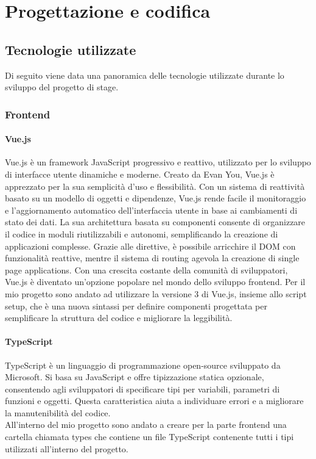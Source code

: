 \chapter{Progettazione e codifica}
\label{cap:progettazione-codifica}


\section{Tecnologie utilizzate}
\label{sec:tecnologie-strumenti}

Di seguito viene data una panoramica delle tecnologie utilizzate durante lo sviluppo del progetto di stage.

\subsection{Frontend}\label{subsec:frontend}
\subsubsection{Vue.js}\label{subsubsec:vue}
Vue.js è un framework JavaScript progressivo e reattivo, utilizzato per lo sviluppo di interfacce utente dinamiche e moderne. 
Creato da Evan You, Vue.js è apprezzato per la sua semplicità d'uso e flessibilità. Con un sistema di reattività basato su un modello di oggetti e dipendenze, 
Vue.js rende facile il monitoraggio e l'aggiornamento automatico dell'interfaccia utente in base ai cambiamenti di stato dei dati. La sua architettura basata 
su componenti consente di organizzare il codice in moduli riutilizzabili e autonomi, semplificando la creazione di applicazioni complesse. 
Grazie alle direttive, è possibile arricchire il DOM con funzionalità reattive, mentre il sistema di routing agevola la creazione di single page applications. 
Con una crescita costante della comunità di sviluppatori, Vue.js è diventato un'opzione popolare nel mondo dello sviluppo frontend.
Per il mio progetto sono andato ad utilizzare la versione 3 di Vue.js, insieme allo script setup, che è una nuova sintassi per definire componenti progettata per semplificare la struttura del codice e migliorare la leggibilità.

\subsubsection{TypeScript}\label{subsubsec:TypeScript}
TypeScript è un linguaggio di programmazione open-source sviluppato da Microsoft. Si basa su JavaScript e offre tipizzazione statica opzionale, 
consentendo agli sviluppatori di specificare tipi per variabili, parametri di funzioni e oggetti. Questa caratteristica aiuta a individuare errori e a migliorare 
la manutenibilità del codice.\\
All'interno del mio progetto sono andato a creare per la parte frontend una cartella chiamata types che contiene un file TypeScript contenente tutti i tipi utilizzati all'interno del progetto.
